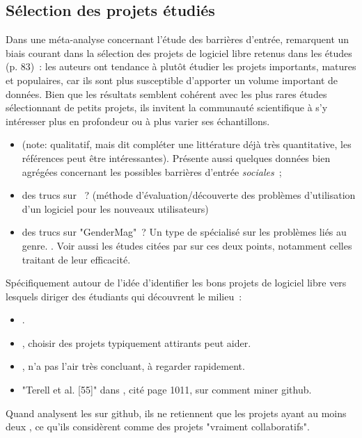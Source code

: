 \subsection{Sélection des projets étudiés}

Dans une méta-analyse concernant l'étude des barrières d'entrée,  remarquent
un biais courant dans la sélection des projets de logiciel libre retenus dans les études (p. 83) : les auteurs
ont tendance à plutôt étudier les projets importants, matures et populaires, car ils sont plus susceptible
d'apporter un volume important de données. Bien que les résultats semblent cohérent avec les plus rares études
sélectionnant de petits projets, ils invitent la communauté scientifique à s'y intéresser plus en profondeur
ou à plus varier ses échantillons.


\begin{itemize}
    \item {} (note: qualitatif, mais dit compléter une littérature déjà très
        quantitative, les références peut être intéressantes). Présente aussi quelques données bien agrégées
        concernant les possibles barrières d'entrée \emph{sociales} ;
    \item des trucs sur  ? (méthode  d'évaluation/découverte des
        problèmes d'utilisation d'un logiciel pour les nouveaux utilisateurs)
    \item des trucs sur "GenderMag" ? Un type de  spécialisé sur les problèmes liés
        au genre. . Voir aussi les études citées par
        \textcite[p.~1005-1006]{barriers-2018} sur ces deux points, notamment celles traitant de leur
        efficacité.
\end{itemize}

Spécifiquement autour de l'idée d'identifier les bons projets de logiciel libre vers lesquels diriger des
étudiants qui découvrent le milieu :

\begin{itemize}
    \item {}.
    \item {}, choisir des projets typiquement attirants peut aider.
    \item {}, n'a pas l'air très concluant, à regarder rapidement.
    \item "Terell et al. [55]" dans \textcite{barriers-2018}, cité page 1011, sur comment miner github.
\end{itemize}

Quand  analysent les  sur github, ils ne retiennent que les
projets ayant au moins deux , ce qu'ils considèrent comme des projets "vraiment
collaboratifs".
